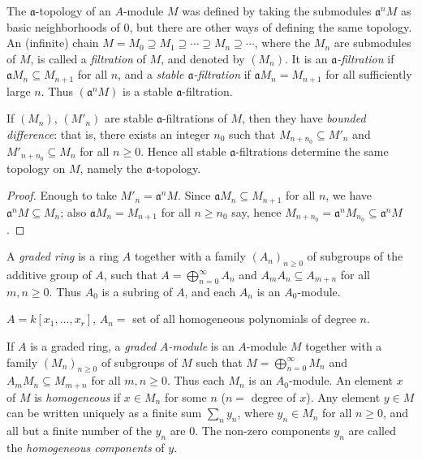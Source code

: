 The $\mathfrak{a}$-topology of an $A$-module $M$ was defined by taking the submodules $\mathfrak{a}^n M$ as basic neighborhoods of $0$, but there are other ways of defining the same topology. An (infinite) chain $M = M_0 \supseteq M_1 \supseteq \cdots \supseteq M_n \supseteq \cdots$, where the $M_n$ are submodules of $M$, is called a \emph{filtration} of $M$, and denoted by $(M_n)$. It is an \emph{$\mathfrak{a}$-filtration} if $\mathfrak{a} M_n \subseteq M_{n+1}$ for all $n$, and a \emph{stable $\mathfrak{a}$-filtration} if $\mathfrak{a} M_n = M_{n+1}$ for all sufficiently large $n$. Thus $(\mathfrak{a}^n M)$ is a stable $\mathfrak{a}$-filtration.

\begin{lemma}\label{lem:stable-filtration-bounded}
If $(M_n)$, $(M'_n)$ are stable $\mathfrak{a}$-filtrations of $M$, then they have \emph{bounded difference}: that is, there exists an integer $n_0$ such that $M_{n+n_0} \subseteq M'_n$ and $M'_{n+n_0} \subseteq M_n$ for all $n \geq 0$. Hence all stable $\mathfrak{a}$-filtrations determine the same topology on $M$, namely the $\mathfrak{a}$-topology.
\end{lemma}

\begin{proof}
Enough to take $M'_n = \mathfrak{a}^n M$. Since $\mathfrak{a} M_n \subseteq M_{n+1}$ for all $n$, we have $\mathfrak{a}^n M \subseteq M_n$; also $\mathfrak{a} M_n = M_{n+1}$ for all $n \geq n_0$ say, hence $M_{n+n_0} = \mathfrak{a}^n M_{n_0} \subseteq \mathfrak{a}^n M$.
\end{proof}

A \emph{graded ring} is a ring $A$ together with a family $(A_n)_{n \geq 0}$ of subgroups of the additive group of $A$, such that $A = \bigoplus_{n=0}^\infty A_n$ and $A_m A_n \subseteq A_{m+n}$ for all $m, n \geq 0$. Thus $A_0$ is a subring of $A$, and each $A_n$ is an $A_0$-module.

\begin{example}
$A = k[x_1, \ldots, x_r]$, $A_n = $ set of all homogeneous polynomials of degree $n$.
\end{example}

If $A$ is a graded ring, a \emph{graded $A$-module} is an $A$-module $M$ together with a family $(M_n)_{n \geq 0}$ of subgroups of $M$ such that $M = \bigoplus_{n=0}^\infty M_n$ and $A_m M_n \subseteq M_{m+n}$ for all $m, n \geq 0$. Thus each $M_n$ is an $A_0$-module. An element $x$ of $M$ is \emph{homogeneous} if $x \in M_n$ for some $n$ ($n = $ degree of $x$). Any element $y \in M$ can be written uniquely as a finite sum $\sum_n y_n$, where $y_n \in M_n$ for all $n \geq 0$, and all but a finite number of the $y_n$ are $0$. The non-zero components $y_n$ are called the \emph{homogeneous components} of $y$.

